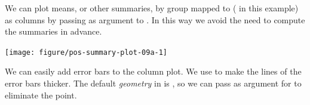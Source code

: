 \documentclass[krantz2]{krantz}\usepackage{knitr}%
\begin{document}
\begin{knitrout}\footnotesize
{}\color{fgcolor}\begin{kframe}
\begin{alltt}
\hlstd{(}  \hlstd{(}    \hlopt{+}
  \hlstd{(} \hlstd{=} \hlstd{,}  \hlstd{=} \hlstd{,}
                \hlstd{=} \hlstd{,}  \hlstd{=} \hlstd{)} \hlopt{+}
  \hlstd{(} \hlstd{=} \hlstd{,}
                \hlstd{=} \hlstd{,}
                \hlstd{=} \hlstd{,}  \hlstd{=} \hlstd{,}  \hlstd{=} \hlstd{)} \hlopt{+}
  \hlstd{(} \hlstd{=} \hlstd{,}  \hlstd{=} \hlstd{)}
\end{alltt}
\end{kframe}
\end{knitrout}

We can plot means, or other summaries, by group mapped to  ( in this example) as columns by passing  as argument to  . In this way we avoid the need to compute the summaries in advance.

\begin{knitrout}\footnotesize
{}\color{fgcolor}\begin{kframe}
\begin{alltt}
  \hlopt{+}
  \hlstd{(} \hlstd{=} \hlstd{,}  
\end{alltt}
\end{kframe}

{\centering \texttt{[image: figure/pos-summary-plot-09a-1]} 

}



\end{knitrout}

We can easily add error bars to the column plot. We use  to make the lines of the error bars thicker. The default \emph{geometry} in  is , so we can pass  as argument for  to eliminate the point.
\end{document}

